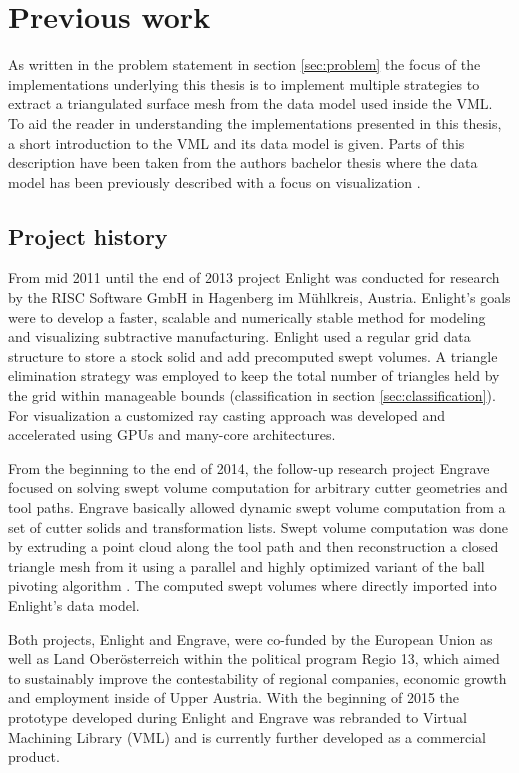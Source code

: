 \chapter{Previous work}
\label{ch:previous_work}

As written in the problem statement in section \ref{sec:problem} the focus of the implementations underlying this thesis is to implement multiple strategies to extract a triangulated surface mesh from the data model used inside the VML.
To aid the reader in understanding the implementations presented in this thesis, a short introduction to the VML and its data model is given.
Parts of this description have been taken from the authors bachelor thesis where the data model has been previously described with a focus on visualization \cite{bachelor}.

\section{Project history}
\label{sec:project_history}

From mid 2011 until the end of 2013 project Enlight was conducted for research by the RISC Software GmbH in Hagenberg im Mühlkreis, Austria.
Enlight's goals were to develop a faster, scalable and numerically stable method for modeling and visualizing subtractive manufacturing.
Enlight used a regular grid data structure to store a stock solid and add precomputed swept volumes.
A triangle elimination strategy was employed to keep the total number of triangles held by the grid within manageable bounds (\cf classification in section \ref{sec:classification}).
For visualization a customized ray casting approach was developed \cite{enlight} and accelerated using GPUs and many-core architectures.

From the beginning to the end of 2014, the follow-up research project Engrave focused on solving swept volume computation for arbitrary cutter geometries and tool paths.
Engrave basically allowed dynamic swept volume computation from a set of cutter solids and transformation lists.
Swept volume computation was done by extruding a point cloud along the tool path and then reconstruction a closed triangle mesh from it using a parallel and highly optimized variant of the ball pivoting algorithm 
\cite{engrave}.
The computed swept volumes where directly imported into Enlight's data model.

Both projects, Enlight and Engrave, were co-funded by the European Union as well as Land Oberösterreich within the political program Regio 13, which aimed to sustainably improve the contestability of regional companies, economic growth and employment inside of Upper Austria.
%
With the beginning of 2015 the prototype developed during Enlight and Engrave was rebranded to Virtual Machining Library (VML) and is currently further developed as a commercial product.

